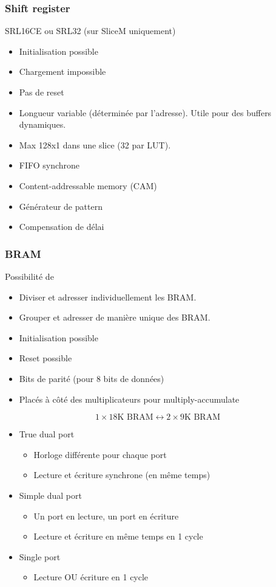 \documentclass[resume]{subfiles}
\begin{document}
\subsubsection{Shift register}
SRL16CE ou SRL32 (sur SliceM uniquement)
\begin{itemize}
\item Initialisation possible
\item Chargement impossible
\item Pas de reset
\item Longueur variable (déterminée par l'adresse). Utile pour des buffers dynamiques.
\item Max 128x1 dans une slice (32 par LUT).
\item FIFO synchrone
\item Content-addressable memory (CAM)
\item Générateur de pattern
\item Compensation de délai
\end{itemize}
\subsubsection{BRAM}
Possibilité de
\begin{itemize}
\item Diviser et adresser individuellement les BRAM. 
\item Grouper et adresser de manière unique des BRAM.
\end{itemize}
\begin{itemize}
\item Initialisation possible
\item Reset possible
\item Bits de parité (pour 8 bits de données)
\item Placés à côté des multiplicateurs pour multiply-accumulate
\end{itemize}
$$1\times 18\text{K BRAM}\longleftrightarrow 2\times 9\text{K BRAM}$$
\begin{itemize}
\item True dual port
\begin{itemize}
\item Horloge différente pour chaque port
\item Lecture et écriture synchrone (en même temps)
\end{itemize}
\item Simple dual port
\begin{itemize}
\item Un port en lecture, un port en écriture
\item Lecture et écriture en même temps en 1 cycle
\end{itemize}
\item Single port
\begin{itemize}
\item Lecture OU écriture en 1 cycle
\end{itemize}
\end{itemize}
\end{document}
